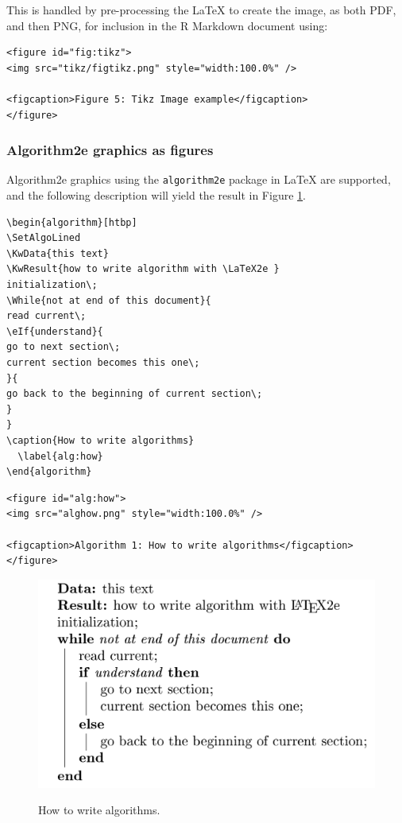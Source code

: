 This is handled by pre-processing the LaTeX to create the image, as both PDF, and then PNG, for inclusion in the R Markdown document using:

\begin{verbatim}
<figure id="fig:tikz">
<img src="tikz/figtikz.png" style="width:100.0%" />

<figcaption>Figure 5: Tikz Image example</figcaption>
</figure>
\end{verbatim}

\subsubsection{Algorithm2e graphics as figures}\label{algorithm2e-graphics-as-figures}

Algorithm2e graphics using the \texttt{algorithm2e} package in LaTeX are supported, and the following description will yield the result in Figure \ref{fig:alghow}.

\begin{verbatim}
\begin{algorithm}[htbp]
\SetAlgoLined
\KwData{this text}
\KwResult{how to write algorithm with \LaTeX2e }
initialization\;
\While{not at end of this document}{
read current\;
\eIf{understand}{
go to next section\;
current section becomes this one\;
}{
go back to the beginning of current section\;
}
}
\caption{How to write algorithms}
  \label{alg:how}
\end{algorithm}
\end{verbatim}

\begin{verbatim}
<figure id="alg:how">
<img src="alghow.png" style="width:100.0%" />

<figcaption>Algorithm 1: How to write algorithms</figcaption>
</figure>
\end{verbatim}

\begin{figure}

{\centering \includegraphics[width=0.6\linewidth,alt={Illustration of an algorithm starting with Data and Result, followed by a while, and an if/else block.}]{figures/alghow} 

}

\caption{How to write algorithms.}\label{fig:alghow}
\end{figure}

